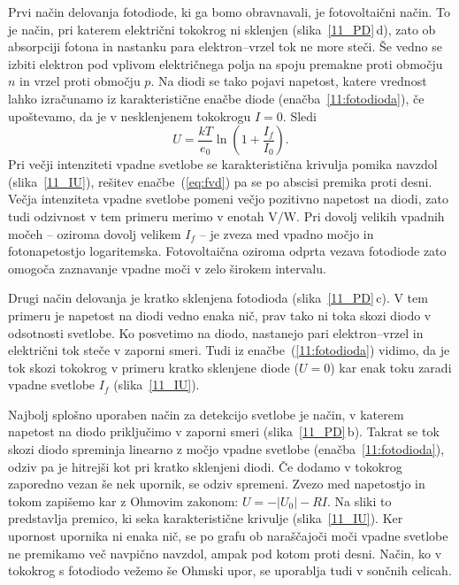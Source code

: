 Prvi način delovanja fotodiode, ki ga bomo obravnavali, je fotovoltaični način.
To je način, pri katerem električni tokokrog ni sklenjen (slika~\ref{11_PD}\,d), 
zato ob absorpciji fotona in nastanku para elektron--vrzel tok ne more steči. 
Še vedno se izbiti elektron pod vplivom električnega polja
na spoju premakne proti območju $n$ in vrzel proti območju $p$.
Na diodi se tako pojavi napetost, 
katere vrednost lahko izračunamo iz karakteristične enačbe diode (enačba~\ref{11:fotodioda}), 
če upoštevamo, da je v nesklenjenem tokokrogu $I=0$. Sledi
\begin{equation}
U = \frac{kT}{e_0}\ln \left(1+ \frac{I_f}{I_0}\right)\!.
\label{eq:fvd}
\end{equation}
Pri večji intenziteti vpadne svetlobe se karakteristična krivulja 
pomika navzdol (slika~\ref{11_IU}), rešitev enačbe~(\ref{eq:fvd}) pa se 
po abscisi premika proti desni.
Večja intenziteta vpadne svetlobe pomeni večjo 
pozitivno napetost na diodi, zato tudi odzivnost v tem primeru merimo v enotah $\si{\volt}/\si{\watt}$.
Pri dovolj velikih vpadnih močeh -- oziroma dovolj velikem $I_f$ -- je
zveza med vpadno močjo in fotonapetostjo
logaritemska. Fotovoltaična oziroma odprta vezava fotodiode zato omogoča 
zaznavanje vpadne moči v zelo širokem intervalu. 

Drugi način delovanja je kratko sklenjena fotodioda (slika~\ref{11_PD}\,c).
V tem primeru je  napetost na diodi 
vedno enaka nič, prav tako ni toka skozi diodo v odsotnosti svetlobe. 
Ko posvetimo na diodo, nastanejo pari elektron--vrzel in električni tok steče
v zaporni smeri. Tudi iz enačbe~(\ref{11:fotodioda}) vidimo, da je tok 
skozi tokokrog v primeru kratko sklenjene diode ($U=0$) kar enak toku 
zaradi vpadne svetlobe $I_f$ (slika~\ref{11_IU}). 

Najbolj splošno uporaben način za detekcijo svetlobe je način, v katerem 
napetost na diodo priključimo v zaporni smeri (slika~\ref{11_PD}\,b).
Takrat se tok skozi diodo spreminja linearno z močjo vpadne svetlobe
(enačba~\ref{11:fotodioda}), odziv pa je hitrejši
kot pri kratko sklenjeni diodi. Če dodamo v tokokrog zaporedno vezan še nek upornik, se odziv
spremeni. Zvezo med napetostjo in tokom zapišemo kar z Ohmovim zakonom: $U = -|U_0|-RI$. 
Na sliki to predstavlja premico, ki seka karakteristične krivulje (slika~\ref{11_IU}). Ker upornost
upornika ni enaka nič, se po grafu ob naraščajoči moči vpadne svetlobe ne premikamo več navpično navzdol, 
ampak pod kotom proti desni. Način, ko v tokokrog s fotodiodo vežemo še Ohmski upor,
se uporablja tudi v sončnih celicah. 

